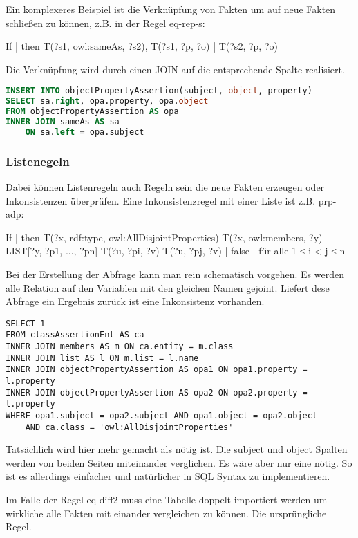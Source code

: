 Ein komplexeres Beispiel ist die Verknüpfung von Fakten um auf neue Fakten schließen zu können, z.B. in der Regel eq-rep-s:

If | then
T(?s1, owl:sameAs, ?s2), T(?s1, ?p, ?o) | T(?s2, ?p, ?o)

Die Verknüpfung wird durch einen JOIN auf die entsprechende Spalte realisiert.

\begin{lstlisting}[language=SQL]
INSERT INTO objectPropertyAssertion(subject, object, property)
SELECT sa.right, opa.property, opa.object
FROM objectPropertyAssertion AS opa
INNER JOIN sameAs AS sa
	ON sa.left = opa.subject
\end{lstlisting}

\subsubsection{Listenegeln}
Dabei können Listenregeln auch Regeln sein die neue Fakten erzeugen oder Inkonsistenzen überprüfen. Eine Inkonsistenzregel mit einer Liste ist z.B. prp-adp:

If | then
T(?x, rdf:type, owl:AllDisjointProperties)
T(?x, owl:members, ?y)
LIST[?y, ?p1, ..., ?pn]
T(?u, ?pi, ?v)
T(?u, ?pj, ?v)                                    | false | für alle 1 ≤ i < j ≤ n 

Bei der Erstellung der Abfrage kann man rein schematisch vorgehen. Es werden alle Relation auf den Variablen mit den gleichen Namen gejoint. Liefert dese Abfrage ein Ergebnis zurück ist eine Inkonsistenz vorhanden.

\begin{lstlisting}
SELECT 1
FROM classAssertionEnt AS ca
INNER JOIN members AS m ON ca.entity = m.class
INNER JOIN list AS l ON m.list = l.name
INNER JOIN objectPropertyAssertion AS opa1 ON opa1.property = l.property
INNER JOIN objectPropertyAssertion AS opa2 ON opa2.property = l.property
WHERE opa1.subject = opa2.subject AND opa1.object = opa2.object
	AND ca.class = 'owl:AllDisjointProperties'
\end{lstlisting}

Tatsächlich wird hier mehr gemacht als nötig ist. Die subject und object Spalten werden von beiden Seiten miteinander verglichen. Es wäre aber nur eine nötig. So ist es allerdings einfacher und natürlicher in SQL Syntax zu implementieren.

Im Falle der Regel eq-diff2 muss eine Tabelle doppelt importiert werden um wirkliche alle Fakten mit einander vergleichen zu können. Die ursprüngliche Regel.

